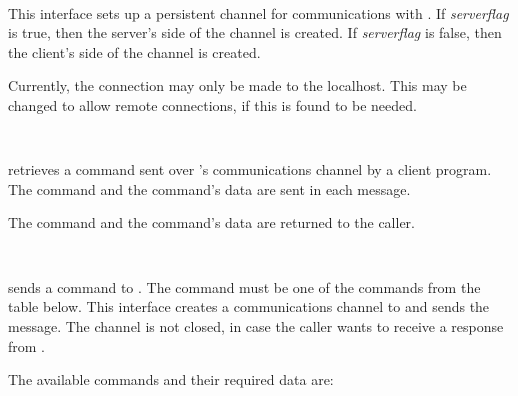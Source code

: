 \begin{description}

\item {}\verb" "

This interface sets up a persistent channel for communications with
.  If {\it serverflag} is true, then the server's side of the
channel is created.  If {\it serverflag} is false, then the client's side of
the channel is created.

Currently, the connection may only be made to the localhost.  This may be
changed to allow remote connections, if this is found to be needed.

\item {}\verb" "

 retrieves a command sent over 's
communications channel by a client program.  The command and the command's
data are sent in each message.

The command and the command's data are returned to the caller.

\item {}\verb" "

 sends a command to .  The command must
be one of the commands from the table below.  This interface creates a
communications channel to  and sends the message.  The channel is
not closed, in case the caller wants to receive a response from .

The available commands and their required data are:

\begin{table}[ht]
\begin{center}
\begin{tabular}{lll}


\end{tabular}
\end{center}
\end{table}
\end{description}
